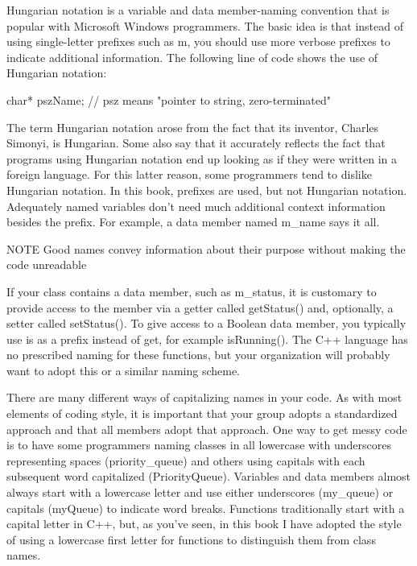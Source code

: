 
Hungarian notation is a variable and data member-naming convention that is popular with Microsoft Windows programmers. The basic idea is that instead of using single-letter prefixes such as m, you should use more verbose prefixes to indicate additional information. The following line of code shows the use of Hungarian notation:

\begin{cpp}
char* pszName; // psz means "pointer to string, zero-terminated"
\end{cpp}

The term Hungarian notation arose from the fact that its inventor, Charles Simonyi, is Hungarian. Some also say that it accurately reflects the fact that programs using Hungarian notation end up looking as if they were written in a foreign language. For this latter reason, some programmers tend to dislike Hungarian notation. In this book, prefixes are used, but not Hungarian notation. Adequately named variables don’t need much additional context information besides the prefix. For example, a data member named m\_name says it all.

\begin{myNotic}{NOTE}
Good names convey information about their purpose without making the code unreadable
\end{myNotic}


If your class contains a data member, such as m\_status, it is customary to provide access to the member via a getter called getStatus() and, optionally, a setter called setStatus(). To give access to a Boolean data member, you typically use is as a prefix instead of get, for example isRunning(). The C++ language has no prescribed naming for these functions, but your organization will probably want to adopt this or a similar naming scheme.


There are many different ways of capitalizing names in your code. As with most elements of coding style, it is important that your group adopts a standardized approach and that all members adopt that approach. One way to get messy code is to have some programmers naming classes in all lowercase with underscores representing spaces (priority\_queue) and others using capitals with each subsequent word capitalized (PriorityQueue). Variables and data members almost always start with a lowercase letter and use either underscores (my\_queue) or capitals (myQueue) to indicate word breaks. Functions traditionally start with a capital letter in C++, but, as you’ve seen, in this book I have adopted the style of using a lowercase first letter for functions to distinguish them from class names.

